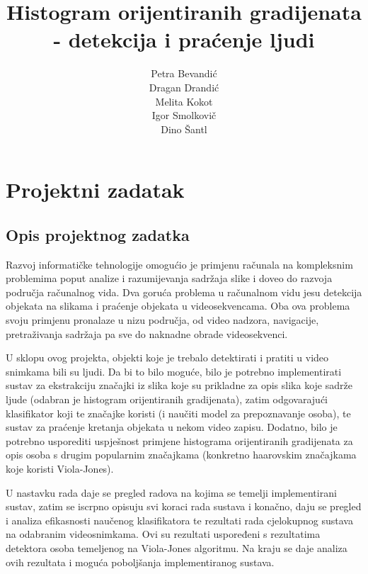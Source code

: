 \documentclass[utf8, seminar, numeric, times]{fer}
\begin{document}
\title{Histogram orijentiranih gradijenata - detekcija i praćenje ljudi}

\author{Petra Bevandić \\ Dragan Drandić \\ Melita Kokot \\ Igor Smolkovič \\ Dino Šantl}

\maketitle

\tableofcontents

\chapter{Projektni zadatak}
\section{Opis projektnog zadatka}
Razvoj informatičke tehnologije omogućio je primjenu računala na kompleksnim problemima poput analize i razumijevanja sadržaja slike i doveo do razvoja područja računalnog vida. Dva goruća problema u računalnom vidu jesu detekcija objekata na slikama i praćenje objekata u videosekvencama. Oba ova problema svoju primjenu pronalaze u nizu područja, od video nadzora, navigacije, pretraživanja sadržaja pa sve do naknadne obrade videosekvenci.

U sklopu ovog projekta, objekti koje je trebalo detektirati i pratiti u video snimkama bili su ljudi. Da bi to bilo moguće, bilo je potrebno implementirati sustav za ekstrakciju značajki iz slika koje su prikladne za opis slika koje sadrže ljude (odabran je histogram orijentiranih gradijenata), zatim odgovarajući klasifikator koji te značajke koristi (i naučiti model za prepoznavanje osoba), te sustav za praćenje kretanja objekata u nekom video zapisu.  Dodatno, bilo je potrebno usporediti uspješnost primjene histograma orijentiranih gradijenata za opis osoba s drugim popularnim značajkama (konkretno haarovskim značajkama koje koristi Viola-Jones).

U nastavku rada daje se pregled radova na kojima se temelji implementirani sustav, zatim  se iscrpno opisuju svi koraci rada sustava i konačno, daju se pregled i analiza efikasnosti naučenog klasifikatora te rezultati rada cjelokupnog sustava na odabranim videosnimkama.  Ovi su rezultati uspoređeni s rezultatima detektora osoba temeljenog na Viola-Jones algoritmu. Na kraju se daje analiza ovih rezultata i moguća poboljšanja implementiranog sustava.
\end{document}
